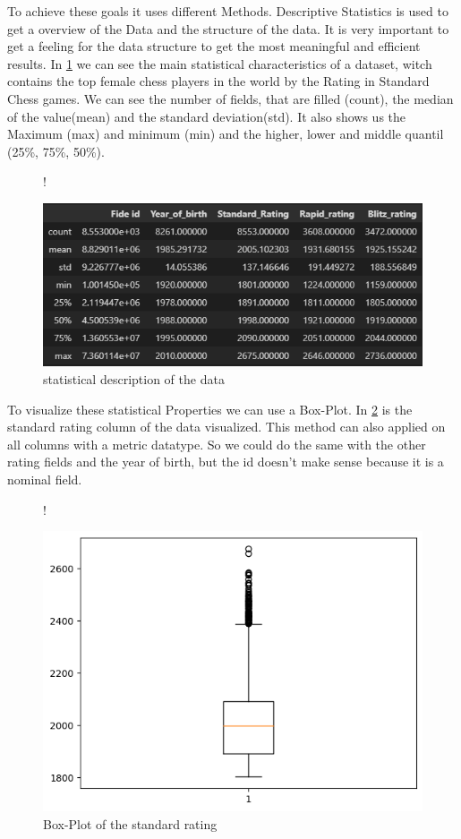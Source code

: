 \documentclass[a4paper, 12pt, oneside]{scrbook}
\begin{document}
			\noindent To achieve these goals it uses different Methods. Descriptive Statistics is used to get a overview of the Data and the structure of the data. It is very important to get a feeling for the data structure to get the most meaningful and efficient results. In \ref{fig:statistical_description} we can see the main statistical characteristics of a dataset, witch contains the top female chess players in the world by the Rating in Standard Chess games. We can see the number of fields, that are filled (count), the median of the value(mean) and the standard deviation(std). It also shows us the Maximum (max) and minimum (min) and the higher, lower and middle quantil (25\%, 75\%, 50\%).
			
			\begin{figure} [H]
				\centering
				\resizebox{\linewidth} {!} {
					\includegraphics{res/df_describes.png}
					
				}
				\caption{statistical description of the data}
				\label{fig:statistical_description}
			\end{figure}
		
			\noindent To visualize these statistical Properties we can use a Box-Plot. In \ref{fig:boxplot} is the standard rating column of the data visualized. This method can also applied on all columns with a metric datatype. So we could do the same with the other rating fields and the year of birth, but the id doesn't make sense because it is a nominal field. 
			
			\begin{figure} [H]
				\centering
				\resizebox{\linewidth} {!} {
					\includegraphics{res/boxplot.png}
					
				}
				\caption{Box-Plot of the standard rating}
				\label{fig:boxplot}
			\end{figure}
		
\end{document}
